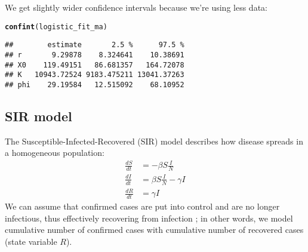 \documentclass{article}\usepackage[]{graphicx}\usepackage[]{color}
\makeatletter
\newcommand{\hlstd}[1]{\textcolor[rgb]{0.345,0.345,0.345}{#1}}%
\newcommand{\hlkwd}[1]{\textcolor[rgb]{0.737,0.353,0.396}{\textbf{#1}}}%
\newenvironment{kframe}{%
 \def\at@end@of@kframe{}%
 \ifinner\ifhmode%
  \def\at@end@of@kframe{\end{minipage}}%
  \begin{minipage}{\columnwidth}%
 \fi\fi%
 \def\FrameCommand##1{\hskip\@totalleftmargin \hskip-\fboxsep
 \colorbox{shadecolor}{##1}\hskip-\fboxsep
     \hskip-\linewidth \hskip-\@totalleftmargin \hskip\columnwidth}%
 \MakeFramed {\advance\hsize-\width
   \@totalleftmargin\z@ \linewidth\hsize
   \@setminipage}}%
 {\par\unskip\endMakeFramed%
 \at@end@of@kframe}
\newenvironment{knitrout}{}{} %
\makeatother
\begin{document}
We get slightly wider confidence intervals because we're using less data:
\begin{knitrout}
\color{fgcolor}\begin{kframe}
\begin{alltt}
\hlkwd{confint}\hlstd{(logistic_fit_ma)}
\end{alltt}
\begin{verbatim}
##        estimate       2.5 %      97.5 %
## r       9.29878    8.324641    10.38691
## X0    119.49151   86.681357   164.72078
## K   10943.72524 9183.475211 13041.37263
## phi    29.19584   12.515092    68.10952
\end{verbatim}
\end{kframe}
\end{knitrout}

\subsection{SIR model}

The Susceptible-Infected-Recovered (SIR) model describes how disease spreads in
a homogeneous population:
\begin{equation}
\begin{aligned}
\frac{dS}{dt} &= - \beta S \frac{I}{N}\\
\frac{dI}{dt} &= \beta S \frac{I}{N} - \gamma I\\
\frac{dR}{dt} &= \gamma I
\end{aligned}
\end{equation}
We can assume that confirmed cases are put into control and are no longer infectious,
thus effectively recovering from infection \citep{he2009plug};
in other words, we model cumulative number of confirmed cases with
cumulative number of recovered cases (state variable $R$).
\end{document}
